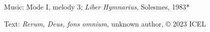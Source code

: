 

\begin{hymnsource}
Music: Mode I, melody 3; \emph{Liber Hymnarius}, Solesmes, 1983*

Text: \emph{Rerum, Deus, fons omnium}, unknown author, © 2023 ICEL
\end{hymnsource}
